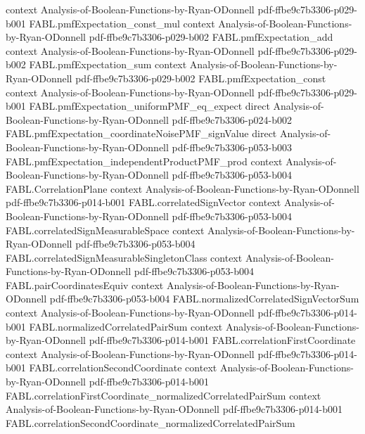 \begin{theorem}
  {context}
  {Analysis-of-Boolean-Functions-by-Ryan-ODonnell}
  {pdf-ffbe9c7b3306-p029-b001}
\proofstep
  {FABL.pmfExpectation_const_mul}
  {context}
  {Analysis-of-Boolean-Functions-by-Ryan-ODonnell}
  {pdf-ffbe9c7b3306-p029-b002}
\proofstep
  {FABL.pmfExpectation_add}
  {context}
  {Analysis-of-Boolean-Functions-by-Ryan-ODonnell}
  {pdf-ffbe9c7b3306-p029-b002}
\proofstep
  {FABL.pmfExpectation_sum}
  {context}
  {Analysis-of-Boolean-Functions-by-Ryan-ODonnell}
  {pdf-ffbe9c7b3306-p029-b002}
\proofstep
  {FABL.pmfExpectation_const}
  {context}
  {Analysis-of-Boolean-Functions-by-Ryan-ODonnell}
  {pdf-ffbe9c7b3306-p029-b001}
\proofstep
  {FABL.pmfExpectation_uniformPMF_eq_expect}
  {direct}
  {Analysis-of-Boolean-Functions-by-Ryan-ODonnell}
  {pdf-ffbe9c7b3306-p024-b002}
\proofstep
  {FABL.pmfExpectation_coordinateNoisePMF_signValue}
  {direct}
  {Analysis-of-Boolean-Functions-by-Ryan-ODonnell}
  {pdf-ffbe9c7b3306-p053-b003}
\proofstep
  {FABL.pmfExpectation_independentProductPMF_prod}
  {context}
  {Analysis-of-Boolean-Functions-by-Ryan-ODonnell}
  {pdf-ffbe9c7b3306-p053-b004}
\proofstep
  {FABL.CorrelationPlane}
  {context}
  {Analysis-of-Boolean-Functions-by-Ryan-ODonnell}
  {pdf-ffbe9c7b3306-p014-b001}
\proofstep
  {FABL.correlatedSignVector}
  {context}
  {Analysis-of-Boolean-Functions-by-Ryan-ODonnell}
  {pdf-ffbe9c7b3306-p053-b004}
\proofstep
  {FABL.correlatedSignMeasurableSpace}
  {context}
  {Analysis-of-Boolean-Functions-by-Ryan-ODonnell}
  {pdf-ffbe9c7b3306-p053-b004}
\proofstep
  {FABL.correlatedSignMeasurableSingletonClass}
  {context}
  {Analysis-of-Boolean-Functions-by-Ryan-ODonnell}
  {pdf-ffbe9c7b3306-p053-b004}
\proofstep
  {FABL.pairCoordinatesEquiv}
  {context}
  {Analysis-of-Boolean-Functions-by-Ryan-ODonnell}
  {pdf-ffbe9c7b3306-p053-b004}
\proofstep
  {FABL.normalizedCorrelatedSignVectorSum}
  {context}
  {Analysis-of-Boolean-Functions-by-Ryan-ODonnell}
  {pdf-ffbe9c7b3306-p014-b001}
\proofstep
  {FABL.normalizedCorrelatedPairSum}
  {context}
  {Analysis-of-Boolean-Functions-by-Ryan-ODonnell}
  {pdf-ffbe9c7b3306-p014-b001}
\proofstep
  {FABL.correlationFirstCoordinate}
  {context}
  {Analysis-of-Boolean-Functions-by-Ryan-ODonnell}
  {pdf-ffbe9c7b3306-p014-b001}
\proofstep
  {FABL.correlationSecondCoordinate}
  {context}
  {Analysis-of-Boolean-Functions-by-Ryan-ODonnell}
  {pdf-ffbe9c7b3306-p014-b001}
\proofstep
  {FABL.correlationFirstCoordinate_normalizedCorrelatedPairSum}
  {context}
  {Analysis-of-Boolean-Functions-by-Ryan-ODonnell}
  {pdf-ffbe9c7b3306-p014-b001}
\proofstep
  {FABL.correlationSecondCoordinate_normalizedCorrelatedPairSum}

\end{theorem}
